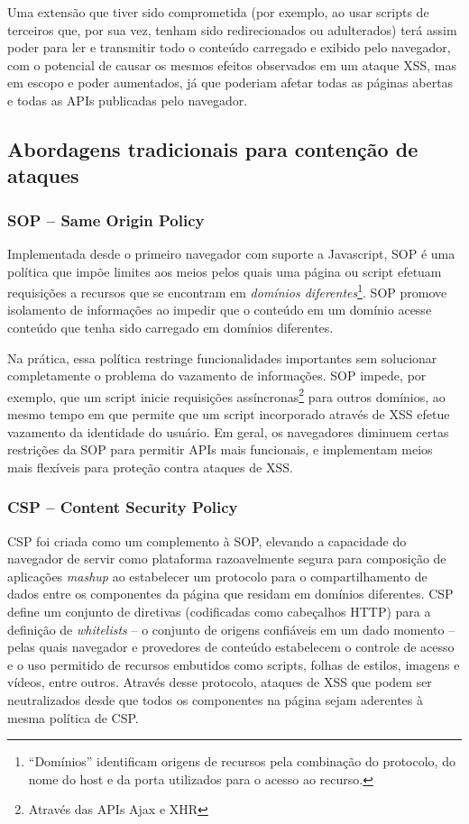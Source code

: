Uma extensão que tiver sido comprometida (por exemplo, ao usar scripts de terceiros que, por sua vez, tenham sido redirecionados ou adulterados) terá assim poder para ler e transmitir todo o conteúdo carregado e exibido pelo navegador, com o potencial de causar os mesmos efeitos observados em um ataque XSS, mas em escopo e poder aumentados, já que poderiam afetar todas as páginas abertas e todas as APIs publicadas pelo navegador.

\subsection{Abordagens tradicionais para contenção de ataques}

\subsubsection{SOP -- Same Origin Policy}
Implementada desde o primeiro navegador com suporte a Javascript, SOP \cite{W3C:SOP} é uma política que impõe limites aos meios pelos quais uma página ou script efetuam requisições a recursos que se encontram em \textit{domínios diferentes}\footnote{``Domínios'' identificam origens de recursos pela combinação do protocolo, do nome do host e da porta utilizados para o acesso ao recurso.}. SOP promove isolamento de informações ao impedir que o conteúdo em um domínio acesse conteúdo que tenha sido carregado em domínios diferentes.

Na prática, essa política restringe funcionalidades importantes sem solucionar completamente o problema do vazamento de informações. SOP impede, por exemplo, que um script inicie requisições assíncronas\footnote{Através das	APIs Ajax e XHR} para outros domínios, ao mesmo tempo em que permite que um script incorporado através de XSS efetue vazamento da identidade do usuário. Em geral, os navegadores diminuem certas restrições da SOP para permitir APIs mais funcionais, e implementam meios mais flexíveis para proteção contra ataques de XSS.

\subsubsection{CSP -- Content Security Policy}
CSP foi criada como um complemento à SOP, elevando a capacidade do navegador de servir como plataforma razoavelmente segura para composição de aplicações \textit{mashup} ao estabelecer um protocolo para o compartilhamento de dados entre os componentes da página que residam em domínios diferentes. CSP define um conjunto de diretivas (codificadas como cabeçalhos HTTP) para a definição de \textit{whitelists} -- o conjunto de origens confiáveis em um dado momento -- pelas quais navegador e provedores de conteúdo estabelecem o controle de acesso e o uso permitido de recursos embutidos como scripts, folhas de estilos, imagens e vídeos, entre outros. Através desse protocolo, ataques de XSS que podem ser neutralizados desde que todos os componentes na página sejam aderentes à mesma política de CSP.

